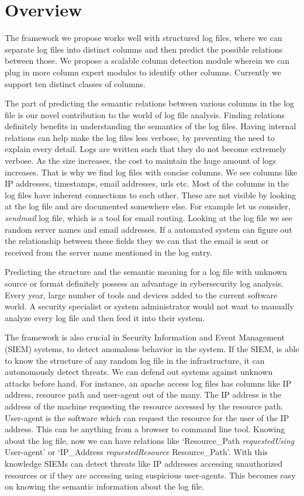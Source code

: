 \chapter{Overview}
\thispagestyle{plain}
\label{Overview}

The framework we propose works well with structured log files, where we can separate log files into distinct columns and then predict the possible relations between those. We propose a scalable column detection module wherein we can plug in more column expert modules to identify other columns. Currently we support ten distinct classes of columns.

The part of predicting the semantic relations between various columns in the log file is our novel contribution to the world of log file analysis. Finding relations definitely benefits in understanding the semantics of the log files. Having internal relations can help make the log files less verbose, by preventing the need to explain every detail. Logs are written such that they do not become extremely verbose. As the size increases, the cost to maintain the huge amount of logs increases. That is why we find log files with concise columns. We see columns like IP addresses, timestamps, email addresses, urls etc. Most of the columns in the log files have inherent connections to each other. These are not visible by looking at the log file and are documented somewhere else. For example let us consider, \textit{sendmail} log file, which is a tool for email routing. Looking at the log file we see random server names and email addresses. If a automated system can figure out the relationship between these fields they we can that the email is sent or received from the server name mentioned in the log entry.

Predicting the structure and the semantic meaning for a log file with unknown source or format definitely possess an advantage in cybersecurity log analysis. Every year, large number of tools and devices added to the current software world. A security specialist or system administrator would not want to manually analyze every log file and then feed it into their system. 

The framework is also crucial in Security Information and Event Management (SIEM) systems, to detect anomalous behavior in the system. If the SIEM, is able to know the structure of any random log file in the infrastructure, it can autonomously detect threats. We can defend out systems against unknown attacks before hand. For instance, an apache access log files has columns like IP address, resource path and user-agent out of the many. The IP address is the address of the machine requesting the resource accessed by the resource path. User-agent is the software which can request the resource for the user of the IP address. This can be anything from a browser to command line tool. Knowing about the log file, now we can have relations like `Resource\_Path \textit{requestedUsing} User-agent' or `IP\_Address \textit{requestedResource} Resource\_Path'. With this knowledge SIEMs can detect threats like IP addresses accessing unauthorized resources or if they are accessing using suspicious user-agents. This becomes easy on knowing the semantic information about the log file.

